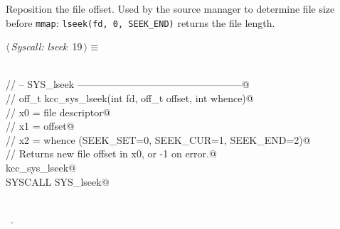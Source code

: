 \documentclass[11pt,a4paper,twoside,openright,DIV=15]{scrbook}
\theoremstyle{definition}
\theoremstyle{plain}
\theoremstyle{remark}
\begin{document}
Reposition the file offset.  Used by the source manager to determine
file size before \texttt{mmap}: \texttt{lseek(fd, 0, SEEK\_END)}
returns the file length.

\begin{flushleft} \small
\begin{minipage}{\linewidth}\label{scrap9}\raggedright\small
{} $\langle\,${\itshape Syscall: lseek}\nobreak\ {\footnotesize {19}}$\,\rangle\equiv$
\vspace{-1ex}
\begin{list}{}{} \item
\mbox{}\verb@@\\
\mbox{}\verb@// -- SYS_lseek --------------------------------------------------@\\
\mbox{}\verb@// off_t kcc_sys_lseek(int fd, off_t offset, int whence)@\\
\mbox{}\verb@//   x0 = file descriptor@\\
\mbox{}\verb@//   x1 = offset@\\
\mbox{}\verb@//   x2 = whence (SEEK_SET=0, SEEK_CUR=1, SEEK_END=2)@\\
\mbox{}\verb@// Returns new file offset in x0, or -1 on error.@\\
\mbox{}\verb@FUNC kcc_sys_lseek@\\
\mbox{}\verb@    SYSCALL SYS_lseek@\\
\mbox{}\verb@ENDFUNC@\\
\mbox{}\verb@@{\NWsep}
\end{list}
\vspace{-1.5ex}
\footnotesize
\begin{list}{}{\setlength{\itemsep}{-\parsep}\setlength{\itemindent}{-\leftmargin}}
\item \NWtxtMacroRefIn\ .

\item{}
\end{list}
\end{minipage}\vspace{4ex}
\end{flushleft}
%
%
\end{document}
